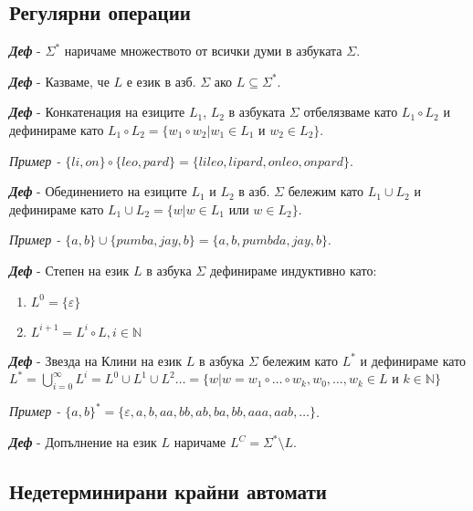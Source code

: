 \documentclass[fleqn,12pt]{article}
\begin{document}
\begin{flushleft}

\subsection{Регулярни операции}

\textit{\textbf{Деф}} - $\Sigma^*$ наричаме множеството от всички думи в азбуката $\Sigma$.

\textit{\textbf{Деф}} - Казваме, че $L$ е език в азб. $\Sigma$ ако $L \subseteq \Sigma^*$.

\textit{\textbf{Деф}} - Конкатенация на езиците $L_1$, $L_2$ в азбуката $\Sigma$ отбелязваме като $L_1 \circ L_2$ и дефинираме като $L_1 \circ L_2 = \{w_1 \circ w_2 | w_1 \in L_1 $ и $ w_2 \in L_2\}$.

\textit{Пример - $\{li, on\} \circ \{leo, pard\} = \{lileo, lipard, onleo, onpard\}$}.

\textit{\textbf{Деф}} - Обединението на езиците $L_1$ и $L_2$ в азб. $\Sigma$ бележим като $L_1 \cup L_2$ и дефинираме като $L_1 \cup L_2 = \{w | w \in L_1 $ или $ w \in L_2\}$.

\textit{Пример - $\{a, b\} \cup \{pumba, jay, b\} = \{a, b, pumbda, jay, b\}$}.

\textit{\textbf{Деф}} - Степен на език $L$ в азбука $\Sigma$ дефинираме индуктивно като:
\begin{enumerate}
    \item $L^0 = \{\varepsilon\}$
    \item $L^{i+1} = L^i \circ L, i \in \mathbb{N}$
\end{enumerate}

\textit{\textbf{Деф}} - Звезда на Клини на език $L$ в азбука $\Sigma$ бележим като $L^*$ и дефинираме като $L^* = \bigcup\limits_{i=0}^{\infty} L^{i} = L^0 \cup L^1 \cup L^2 \dots = \{w | w = w_1 \circ \dots \circ w_k, w_0, \dots, w_k \in L $ и $ k \in \mathbb{N}\}$

\textit{Пример - $\{a, b\}^* = \{\varepsilon, a, b, aa, bb, ab, ba, bb, aaa, aab, \dots\}$}.

\textit{\textbf{Деф}} - Допълнение на език $L$ наричаме $L^C = \Sigma^* \setminus L$.

\subsection{Недетерминирани крайни автомати}


\end{flushleft}
\end{document}
